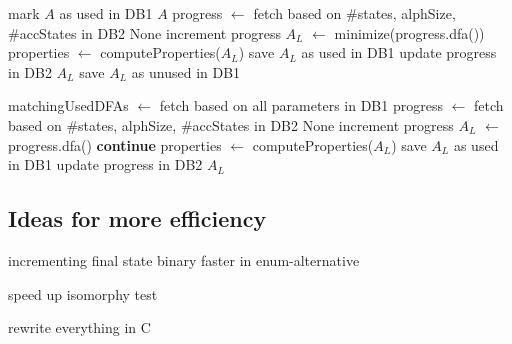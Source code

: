 \documentclass[a4paper, oneside, 11pt]{report}
\theoremstyle{definition}
\theoremstyle{remark}
\begin{document}
\vspace{0.2cm}
\begin{algorithmic}[1]
		\State mark $A$ as used in DB1
		\State \Return $A$
	\EndIf
	\State progress $\gets$ fetch based on \#states, alphSize, \#accStates in DB2
			\State \Return None
		\EndIf
		\State increment progress
		\State $A_L$ $\gets$ minimize(progress.dfa())
		\State properties $\gets$ computeProperties($A_L$)
				\State save $A_L$ as used in DB1
				\State update progress in DB2
				\State \Return $A_L$
			\Else
				\State save $A_L$ as unused in DB1
			\EndIf
		\EndIf
	\EndWhile
	\EndFunction
\end{algorithmic}
\vspace{0.2cm}

\vspace{0.2cm}
\begin{algorithmic}[1]
		\State matchingUsedDFAs $\gets$ fetch based on all parameters in DB1
		\State progress $\gets$ fetch based on \#states, alphSize, \#accStates in DB2
				\State \Return None
			\EndIf
			\State increment progress
			\State $A_L$ $\gets$ progress.dfa()
				\State \textbf{continue}
			\EndIf
			\State properties $\gets$ computeProperties($A_L$)
					\State save $A_L$ as used in DB1
					\State update progress in DB2
					\State \Return $A_L$
				\EndIf
			\EndIf
		\EndWhile
	\EndFunction
\end{algorithmic}
\vspace{0.2cm}

\subsection{Ideas for more efficiency}

incrementing final state binary faster in enum-alternative

speed up isomorphy test

rewrite everything in C
\end{document}
